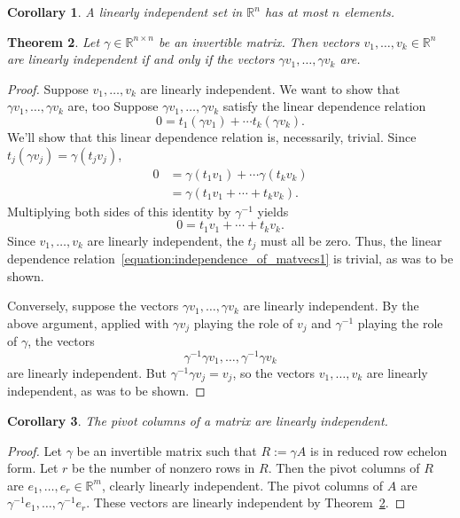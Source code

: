 \documentclass{amsart}
\newcommand{\RR}{\mathbb{R}}
\newtheorem{theorem}{Theorem}[section]
\newtheorem{corollary}[theorem]{Corollary}
\theoremstyle{definition}
\begin{document}
   \begin{corollary}\label{corollary:lin_ind_subset_Rn_small}
    A linearly independent set in $\RR^n$ has at most $n$ elements.
  \end{corollary}

  \begin{theorem}\label{theorem:independence_of_matvecs}
  Let $\gamma\in\RR^{n\times n}$ be an invertible matrix.
  Then vectors $v_1,\ldots,v_k\in\RR^n$ are linearly independent if and only if the vectors $\gamma v_1,\ldots,\gamma v_k$ are.
\end{theorem}

\begin{proof}
Suppose $v_1,\ldots,v_k$ are linearly independent.
We want to show that $\gamma v_1,\ldots,\gamma v_k$ are, too
Suppose $\gamma v_1,\ldots,\gamma v_k$ satisfy the linear dependence relation
\begin{equation}\label{equation:independence_of_matvecs1}
0 = t_1(\gamma v_1) + \cdots t_k(\gamma v_k).
\end{equation}
We'll show that this linear dependence relation is, necessarily, trivial.
Since $t_j(\gamma v_j) = \gamma (t_jv_j)$,
\begin{align*}
0 &= \gamma (t_1 v_1) + \cdots \gamma(t_k v_k)\\
&= \gamma(t_1v_1 + \cdots + t_kv_k).
\end{align*}
Multiplying both sides of this identity by $\gamma^{-1}$ yields
\[
0=t_1v_1+\cdots+ t_kv_k.
\]
Since $v_1,\ldots,v_k$ are linearly independent, the $t_j$ must all be zero.
Thus, the linear dependence relation~\eqref{equation:independence_of_matvecs1} is trivial, as was to be shown.

Conversely, suppose the vectors $\gamma v_1,\ldots,\gamma v_k$ are linearly independent.
By the above argument, applied with $\gamma v_j$ playing the role of $v_j$ and $\gamma^{-1}$ playing the role of $\gamma$, the vectors
\[
\gamma^{-1}\gamma v_1,\ldots,\gamma^{-1}\gamma v_k
\]
are linearly independent. But $\gamma^{-1}\gamma v_j=v_j$, so the vectors $v_1,\ldots,v_k$ are linearly independent, as was to be shown.
\end{proof}


\begin{corollary}\label{corollary:piv_cols_lin_ind}
  The pivot columns of a matrix are linearly independent.
\end{corollary}

\begin{proof}
Let $\gamma$ be an invertible matrix such that $R:=\gamma A$ is in reduced row echelon form.
Let $r$ be the number of nonzero rows in $R$.
Then the pivot columns of $R$ are $e_1,\ldots,e_r\in\RR^m$, clearly linearly independent.
The pivot columns of $A$ are $\gamma^{-1}e_1,\ldots,\gamma^{-1}e_r$.
These vectors are linearly independent by Theorem~\ref{theorem:independence_of_matvecs}.
\end{proof}
\end{document}
